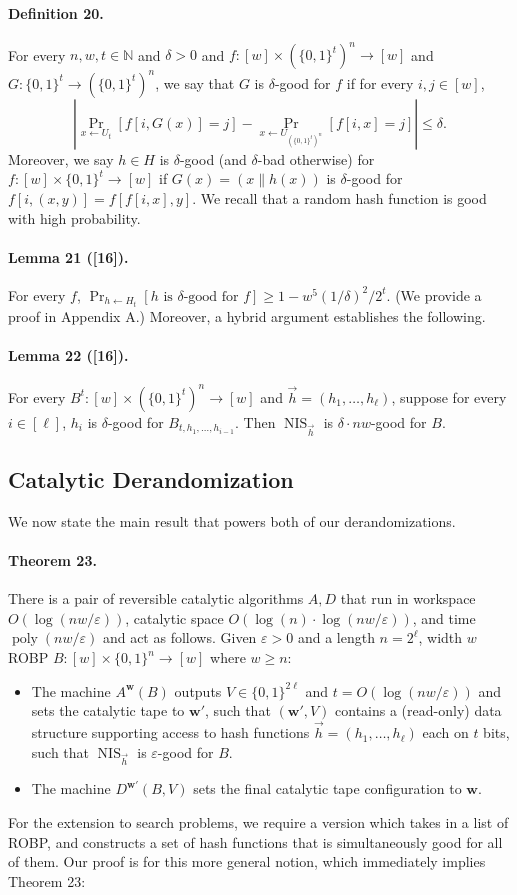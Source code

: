 \documentclass[10pt,a4paper]{article}
\begin{document}
\paragraph{Definition 20.} For every $n,w,t\in\mathbb N$ and $\delta>0$ and $f:[w]\times(\{0,1\}^t)^n\to[w]$ and $G:\{0,1\}^t\to(\{0,1\}^t)^n$, we say that $G$ is $\delta$-good for $f$ if for every $i,j\in[w]$,
\[\left|\Pr_{x\leftarrow U_t}[f[i,G(x)]=j]-\Pr_{x\leftarrow U_{(\{0,1\}^t)^n}}[f[i,x]=j]\right|\leq\delta.\]
Moreover, we say $h\in H$ is $\delta$-good (and $\delta$-bad otherwise) for $f:[w]\times\{0,1\}^t\to[w]$ if $G(x)=(x\|h(x))$ is $\delta$-good for $f[i,(x,y)]=f[f[i,x],y]$.
We recall that a random hash function is good with high probability.
\paragraph{Lemma 21 ([16]).} For every $f$, $\Pr_{h\leftarrow H_t}[h\text{ is }\delta\text{-good for }f]\geq1-w^5(1/\delta)^2/2^t$.
(We provide a proof in Appendix A.) Moreover, a hybrid argument establishes the following.
\paragraph{Lemma 22 ([16]).} For every $B^t:[w]\times(\{0,1\}^t)^n\to[w]$ and $\vec h=(h_1,\ldots,h_\ell)$, suppose for every $i\in[\ell]$, $h_i$ is $\delta$-good for $B_{t,h_1,\ldots,h_{i-1}}$. Then $\operatorname{NIS}_{\vec h}$ is $\delta\cdot nw$-good for $B$.
\subsection*{Catalytic Derandomization}
We now state the main result that powers both of our derandomizations.
\paragraph{Theorem 23.} There is a pair of reversible catalytic algorithms $A,D$ that run in workspace $O(\log(nw/\varepsilon))$, catalytic space $O(\log(n)\cdot\log(nw/\varepsilon))$, and time $\operatorname{poly}(nw/\varepsilon)$ and act as follows. Given $\varepsilon>0$ and a length $n=2^\ell$, width $w$ ROBP $B:[w]\times\{0,1\}^n\to[w]$ where $w\geq n$:
\begin{itemize}
\item The machine $A^{\mathbf w}(B)$ outputs $V\in\{0,1\}^{2\ell}$ and $t=O(\log(nw/\varepsilon))$ and sets the catalytic tape to $\mathbf w'$, such that $(\mathbf w',V)$ contains a (read-only) data structure supporting access to hash functions $\vec h=(h_1,\ldots,h_\ell)$ each on $t$ bits, such that $\operatorname{NIS}_{\vec h}$ is $\varepsilon$-good for $B$.
\item The machine $D^{\mathbf w'}(B,V)$ sets the final catalytic tape configuration to $\mathbf w$.
\end{itemize}
For the extension to search problems, we require a version which takes in a list of ROBP, and constructs a set of hash functions that is simultaneously good for all of them. Our proof is for this more general notion, which immediately implies Theorem 23:
\end{document}
